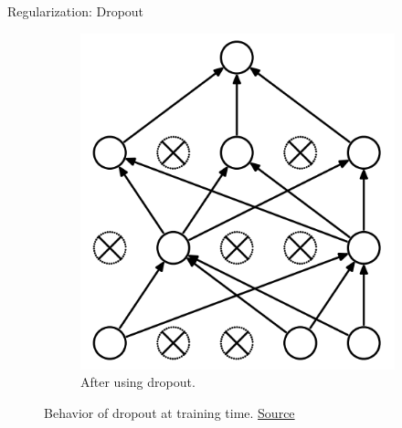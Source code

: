 \begin{frame}{Regularization: Dropout}
\begin{figure}[H]
\begin{subfigure}[b]{0.3\textwidth}
	\includegraphics[width=\textwidth]{Figs/Dropout-after.png}
	\caption{After using dropout.}
	\label{fig:Dropout-after}
\end{subfigure}
\caption{Behavior of dropout at training time. \href{https://www.cs.toronto.edu/~hinton/absps/JMLRdropout.pdf}{Source}}
\end{figure}
\end{frame}

